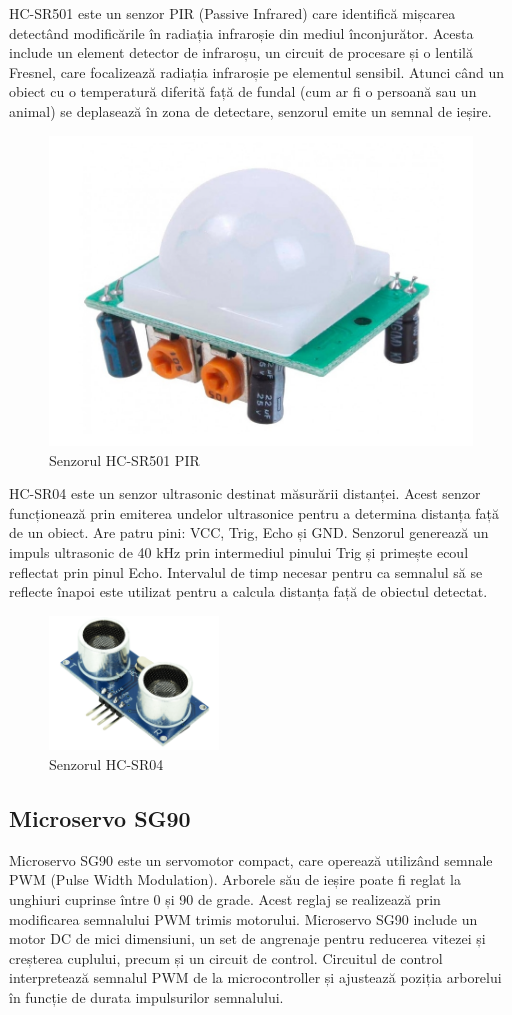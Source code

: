 HC-SR501 este un senzor PIR (Passive Infrared) care identifică mișcarea detectând modificările în radiația infraroșie din mediul înconjurător. Acesta include un element detector de infraroșu, un circuit de procesare și o lentilă Fresnel, care focalizează radiația infraroșie pe elementul sensibil. Atunci când un obiect cu o temperatură diferită față de fundal (cum ar fi o persoană sau un animal) se deplasează în zona de detectare, senzorul emite un semnal de ieșire.

\begin{figure}[H]
\includegraphics[width=0.4\linewidth]{images/pir.png}
\caption{Senzorul HC-SR501 PIR\cite{pir_poza}}
\label{fig:pir}
\end{figure}

HC-SR04 este un senzor ultrasonic destinat măsurării distanței. Acest senzor funcționează prin emiterea undelor ultrasonice pentru a determina distanța față de un obiect. Are patru pini: VCC, Trig, Echo și GND. Senzorul generează un impuls ultrasonic de 40 kHz prin intermediul pinului Trig și primește ecoul reflectat prin pinul Echo. Intervalul de timp necesar pentru ca semnalul să se reflecte înapoi este utilizat pentru a calcula distanța față de obiectul detectat.

\begin{figure}[H]
\includegraphics[width=0.4\textwidth, height=0.3\textwidth]{images/ultrasonic.png}
\caption{Senzorul HC-SR04\cite{ultras_poza}}
\label{fig:ultrasonic}
\end{figure}


\subsection{Microservo SG90}
Microservo SG90 este un servomotor compact, care operează utilizând semnale PWM (Pulse Width Modulation). Arborele său de ieșire poate fi reglat la unghiuri cuprinse între 0 și 90 de grade. Acest reglaj se realizează prin modificarea semnalului PWM trimis motorului. Microservo SG90 include un motor DC de mici dimensiuni, un set de angrenaje pentru reducerea vitezei și creșterea cuplului, precum și un circuit de control. Circuitul de control interpretează semnalul PWM de la microcontroller și ajustează poziția arborelui în funcție de durata impulsurilor semnalului.

